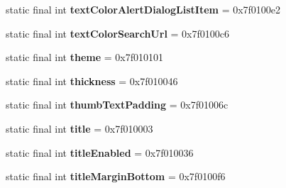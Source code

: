 \begin{DoxyCompactItemize}
\item 
\hypertarget{classandroid_1_1support_1_1design_1_1_r_1_1attr_a662d370f1b26a96ef3a6cfb38fd88262}{}static final int {\bfseries text\+Color\+Alert\+Dialog\+List\+Item} = 0x7f0100e2\label{classandroid_1_1support_1_1design_1_1_r_1_1attr_a662d370f1b26a96ef3a6cfb38fd88262}

\item 
\hypertarget{classandroid_1_1support_1_1design_1_1_r_1_1attr_a3a48c2a0b795f2f217674c7fd606364e}{}static final int {\bfseries text\+Color\+Search\+Url} = 0x7f0100c6\label{classandroid_1_1support_1_1design_1_1_r_1_1attr_a3a48c2a0b795f2f217674c7fd606364e}

\item 
\hypertarget{classandroid_1_1support_1_1design_1_1_r_1_1attr_ae8f71f29f7bb0402c673e98fc94ee2fa}{}static final int {\bfseries theme} = 0x7f010101\label{classandroid_1_1support_1_1design_1_1_r_1_1attr_ae8f71f29f7bb0402c673e98fc94ee2fa}

\item 
\hypertarget{classandroid_1_1support_1_1design_1_1_r_1_1attr_ad6da1795dd352215632c62593b260870}{}static final int {\bfseries thickness} = 0x7f010046\label{classandroid_1_1support_1_1design_1_1_r_1_1attr_ad6da1795dd352215632c62593b260870}

\item 
\hypertarget{classandroid_1_1support_1_1design_1_1_r_1_1attr_a54e1b26aa0d6ec5ddefa2a11fbf42d9f}{}static final int {\bfseries thumb\+Text\+Padding} = 0x7f01006c\label{classandroid_1_1support_1_1design_1_1_r_1_1attr_a54e1b26aa0d6ec5ddefa2a11fbf42d9f}

\item 
\hypertarget{classandroid_1_1support_1_1design_1_1_r_1_1attr_a457bf617809270ed8af320d41357f187}{}static final int {\bfseries title} = 0x7f010003\label{classandroid_1_1support_1_1design_1_1_r_1_1attr_a457bf617809270ed8af320d41357f187}

\item 
\hypertarget{classandroid_1_1support_1_1design_1_1_r_1_1attr_a4dde193ec35594da99607aa85ad0b723}{}static final int {\bfseries title\+Enabled} = 0x7f010036\label{classandroid_1_1support_1_1design_1_1_r_1_1attr_a4dde193ec35594da99607aa85ad0b723}

\item 
\hypertarget{classandroid_1_1support_1_1design_1_1_r_1_1attr_a87245c54e5e4a03a199ea283004b986b}{}static final int {\bfseries title\+Margin\+Bottom} = 0x7f0100f6\label{classandroid_1_1support_1_1design_1_1_r_1_1attr_a87245c54e5e4a03a199ea283004b986b}


\end{DoxyCompactItemize}
